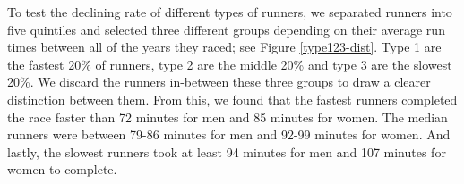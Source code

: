 \documentclass[12pt]{article}
\begin{document}



To test the declining rate of different types of runners,
we separated runners into five quintiles and selected three different
groups depending on their average run times between all of the years they
raced; see Figure \ref{type123-dist}.
Type 1 are the fastest 20\% of runners, type 2 are the middle 20\% and
type 3 are the slowest 20\%.
We discard the runners in-between these three groups to draw a clearer
distinction between them.
From this, we found that the fastest runners completed the race faster
than 72 minutes for men and 85 minutes for women.
The median runners were between 79-86 minutes for men and 92-99 minutes
for women.
And lastly, the slowest runners took at least 94 minutes for men and
107 minutes for women to complete.
\end{document}
